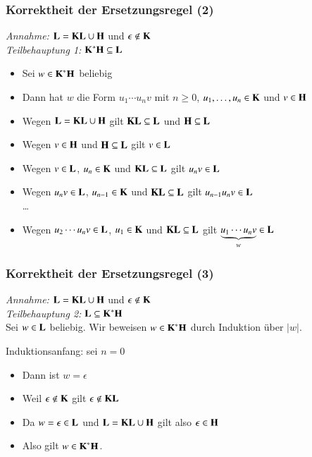 \documentclass[onlymath]{beamer}
\begin{document}
\begin{frame}[t]\frametitle{Korrektheit der Ersetzungsregel (2)}

\emph{Annahme:} $\Slang{L}= \Slang{K}\Slang{L}\cup\Slang{H}$ und $\epsilon\notin\Slang{K}$\\[1ex]

\emph{Teilbehauptung 1:} $\Slang{K}^*\Slang{H}\subseteq\Slang{L}$\pause\\[1ex]

\begin{itemize}
\item Sei $w\in \Slang{K}^*\Slang{H}$ beliebig\pause
\item Dann hat $w$ die Form $u_1\cdots u_n v$ mit $n\geq 0$, $u_1,\ldots,u_n\in\Slang{K}$ und $v\in\Slang{H}$\pause
\item Wegen $\Slang{L}= \Slang{K}\Slang{L}\cup\Slang{H}$ gilt $\Slang{K}\Slang{L}\subseteq\Slang{L}$ und $\Slang{H}\subseteq\Slang{L}$\pause
\item Wegen $v\in\Slang{H}$ und $\Slang{H}\subseteq\Slang{L}$ gilt $v\in\Slang{L}$\pause
\item Wegen $v\in\Slang{L}$, $u_n\in\Slang{K}$ und $\Slang{K}\Slang{L}\subseteq\Slang{L}$ gilt $u_n v\in\Slang{L}$\pause
\item Wegen $u_n v\in\Slang{L}$, $u_{n-1}\in\Slang{K}$ und $\Slang{K}\Slang{L}\subseteq\Slang{L}$ gilt $u_{n-1} u_n v\in\Slang{L}$\pause\\
\ldots
\item Wegen $u_2\cdots u_n v\in\Slang{L}$, $u_1\in\Slang{K}$ und $\Slang{K}\Slang{L}\subseteq\Slang{L}$ gilt $\underbrace{u_1\cdots u_n v}_w\in\Slang{L}$
\end{itemize}

\end{frame}

\begin{frame}[t]\frametitle{Korrektheit der Ersetzungsregel (3)}

\emph{Annahme:} $\Slang{L}= \Slang{K}\Slang{L}\cup\Slang{H}$ und $\epsilon\notin\Slang{K}$\\[1ex]

\emph{Teilbehauptung 2:} $\Slang{L}\subseteq\Slang{K}^*\Slang{H}$\pause\\[1ex]

Sei $w\in \Slang{L}$ beliebig. Wir beweisen $w\in\Slang{K}^*\Slang{H}$ durch Induktion über $|w|$.
\medskip

\alert{Induktionsanfang:} sei $n=0$\pause
\begin{itemize}
\item Dann ist $w=\epsilon$\pause
\item Weil $\epsilon\notin\Slang{K}$ gilt $\epsilon\notin\Slang{K}\Slang{L}$\pause
\item Da $w=\epsilon\in\Slang{L}$ und $\Slang{L}= \Slang{K}\Slang{L}\cup\Slang{H}$ gilt also $\epsilon\in\Slang{H}$\pause
\item Also gilt $w\in\Slang{K}^*\Slang{H}$.
\end{itemize}

\end{frame}
\end{document}
